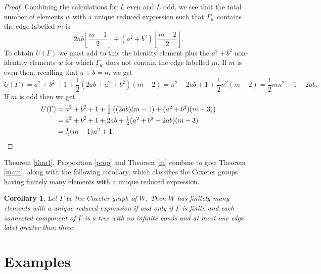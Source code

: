 \documentclass[a4paper,12pt]{article}
\newtheorem{cor}[thm]{Corollary}
\theoremstyle{definition}
\begin{document}
\begin{proof}
Combining the calculations for $L$ even and $L$ odd, we see that the total number of elements $w$ with a unique reduced expression such that $\Gamma_w$ contains the edge labelled $m$ is $$2ab\left\lfloor\frac{m-1}{2}\right\rfloor + (a^2 + b^2)\left\lfloor\frac{m-2}{2}\right\rfloor.$$  To obtain $U(\Gamma)$ we must add to this the identity element plus the $a^2 + b^2$ non-identity elements $w$ for which $\Gamma_w$ does not contain the edge labelled $m$. If $m$ is even then, recalling that $a+b = n$, we get $$U(\Gamma) = a^2 + b^2 + 1 + \textstyle\frac{1}{2}(2ab + a^2 + b^2)(m-2)  = n^2 - 2ab + 1 + \textstyle\frac{1}{2}n^2(m-2) = \frac{1}{2}mn^2 + 1 - 2ab.$$ If $m$ is odd then we get \begin{align*} U(\Gamma) &= a^2 + b^2 + 1 + \textstyle\frac{1}{2}\left((2ab)(m-1) + (a^2 + b^2)(m-3)\right) \\ &= a^2 + b^2 + 1 + 2ab + \textstyle\frac{1}{2}(a^2 + b^2 + 2ab)(m-3) \\ &= \textstyle\frac{1}{2}(m-1)n^2 + 1.\qedhere\end{align*} 
\end{proof}

Theorem \ref{thm1}, Proposition \ref{prop} and Theorem \ref{m} combine to give Theorem \ref{main}, along with the following corollary, which classifies the Coxeter groups having finitely many elements with a unique reduced expression. 

\begin{cor}
Let $\Gamma$ be the Coxeter graph of $W$. Then $W$ has finitely many elements with a unique reduced expression if and only if $\Gamma$ is finite and each connected component of $\Gamma$ is a tree with no infinite bonds and at most one edge label greater than three.
\end{cor}

\section{Examples}
\end{document}
